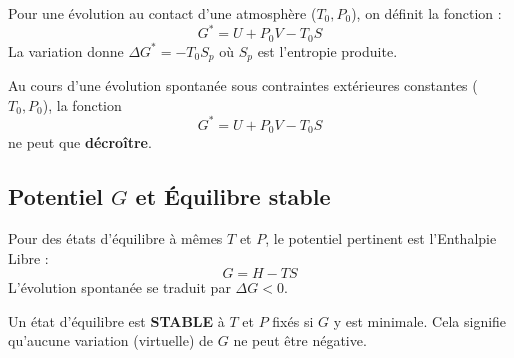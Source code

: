 \documentclass[french]{yLectureNote}
\begin{document}
Pour une évolution au contact d'une atmosphère ($T_0, P_0$), on définit la fonction :
$$G^* = U + P_0V - T_0S$$
La variation donne $\Delta G^* = -T_0 S_{p}$ où $S_p$ est l'entropie produite.




\begin{proposition}
Au cours d'une évolution spontanée sous contraintes extérieures constantes ($T_0, P_0$), la fonction $$G^* = U + P_0V - T_0S$$ ne peut que \textbf{décroître}.
\end{proposition}

\subsection{Potentiel $G$ et Équilibre stable}

\begin{theorem}
Pour des états d'équilibre à mêmes $T$ et $P$, le potentiel pertinent est l'Enthalpie Libre :
$$G = H - TS$$
L'évolution spontanée se traduit par $\Delta G < 0$.
\end{theorem}

Un état d'équilibre est \textbf{STABLE} à $T$ et $P$ fixés si $G$ y est minimale. Cela signifie qu'aucune variation (virtuelle) de $G$ ne peut être négative.
\end{document}
